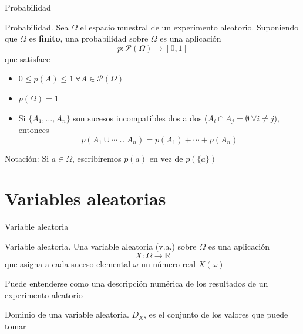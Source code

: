 \documentclass[
  ignorenonframetext,
]{beamer}
\providecommand{\tightlist}{%
  \setlength{\itemsep}{0pt}\setlength{\parskip}{0pt}}
\begin{document}
\begin{frame}{Probabilidad}
\protect\hypertarget{probabilidad-1}{}

Probabilidad. Sea \(\Omega\) el espacio muestral de un experimento
aleatorio. Suponiendo que \(\Omega\) es \textbf{finito}, una
probabilidad sobre \(\Omega\) es una aplicación
\[p: \mathcal{P}(\Omega)\longrightarrow [0,1]\] que satisface

\begin{itemize}
\tightlist
\item
  \(0\le p(A)\le 1 \ \forall A\in\mathcal{P}(\Omega)\)
\item
  \(p(\Omega) = 1\)
\item
  Si \(\{A_1,\dots,A_n\}\) son sucesos incompatibles dos a dos
  (\(A_i\cap A_j=\emptyset \ \forall i\ne j\)), entonces
  \[p(A_1\cup\cdots \cup A_n)=p(A_1)+\cdots+p(A_n)\]
\end{itemize}

Notación: Si \(a\in\Omega\), escribiremos \(p(a)\) en vez de
\(p(\{a\})\)

\end{frame}

\hypertarget{variables-aleatorias}{%
\section{Variables aleatorias}\label{variables-aleatorias}}

\begin{frame}{Variable aleatoria}
\protect\hypertarget{variable-aleatoria}{}

Variable aleatoria. Una variable aleatoria (v.a.) sobre \(\Omega\) es
una aplicación \[X: \Omega\longrightarrow \mathbb{R}\] que asigna a cada
suceso elemental \(\omega\) un número real \(X(\omega)\)

Puede entenderse como una descripción numérica de los resultados de un
experimento aleatorio

Dominio de una variable aleatoria. \(D_X\), es el conjunto de los
valores que puede tomar

\end{frame}
\end{document}
